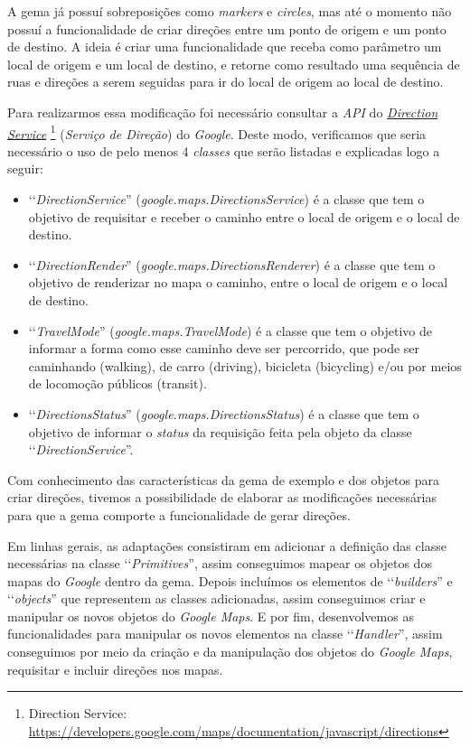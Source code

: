 A gema já possuí sobreposições como \emph{markers} e \emph{circles}, mas até o momento não possuí a
funcionalidade de criar direções entre um ponto de origem e um ponto de destino. A ideia é criar
uma funcionalidade que receba como parâmetro um local de origem e um local de destino, e retorne como
resultado uma sequência de ruas e direções a serem seguidas para ir do local de origem ao local de destino.

Para realizarmos essa modificação foi necessário consultar a \emph{API} do
\emph{\href{https://developers.google.com/maps/documentation/javascript/directions}{Direction Service}}
\footnote{Direction Service: \url{https://developers.google.com/maps/documentation/javascript/directions}}
(\emph{Serviço de Direção}) do \emph{Google}. Deste modo, verificamos que seria necessário o uso de pelo
menos 4 \emph{classes} que serão listadas e explicadas logo a seguir:

\begin{itemize}

 \item ‘‘\emph{DirectionService}'' (\emph{google.maps.DirectionsService}) é a classe que tem o
 objetivo de requisitar e receber o caminho entre o local de origem e o local de destino.

 \item ‘‘\emph{DirectionRender}'' (\emph{google.maps.DirectionsRenderer}) é a classe que tem o
 objetivo de renderizar no mapa o caminho, entre o local de origem e o local de destino.

 \item ‘‘\emph{TravelMode}'' (\emph{google.maps.TravelMode}) é a classe que tem o objetivo de
 informar a forma como esse caminho deve ser percorrido, que pode ser caminhando (walking), de carro
 (driving), bicicleta (bicycling) e/ou por meios de locomoção públicos (transit).

 \item ‘‘\emph{DirectionsStatus}'' (\emph{google.maps.DirectionsStatus}) é a classe que tem o
 objetivo de informar o \emph{status} da requisição feita pela objeto da classe
 ‘‘\emph{DirectionService}''.

\end{itemize}

Com conhecimento das características da gema de exemplo e dos objetos para criar direções, tivemos a
possibilidade de elaborar as modificações necessárias para que a gema comporte a funcionalidade de
gerar direções.

Em linhas gerais, as adaptações consistiram em adicionar a definição das classe
necessárias na classe ‘‘\emph{Primitives}'', assim conseguimos mapear os objetos dos mapas do
\emph{Google} dentro da gema. Depois incluímos os elementos de ‘‘\emph{builders}'' e ‘‘\emph{objects}''
que representem as classes adicionadas, assim conseguimos criar e manipular os novos objetos do
\emph{Google Maps}. E por fim, desenvolvemos as funcionalidades para manipular os novos elementos
na classe ‘‘\emph{Handler}'', assim conseguimos por meio da criação e da manipulação dos objetos do
\emph{Google Maps}, requisitar e incluir direções nos mapas.


